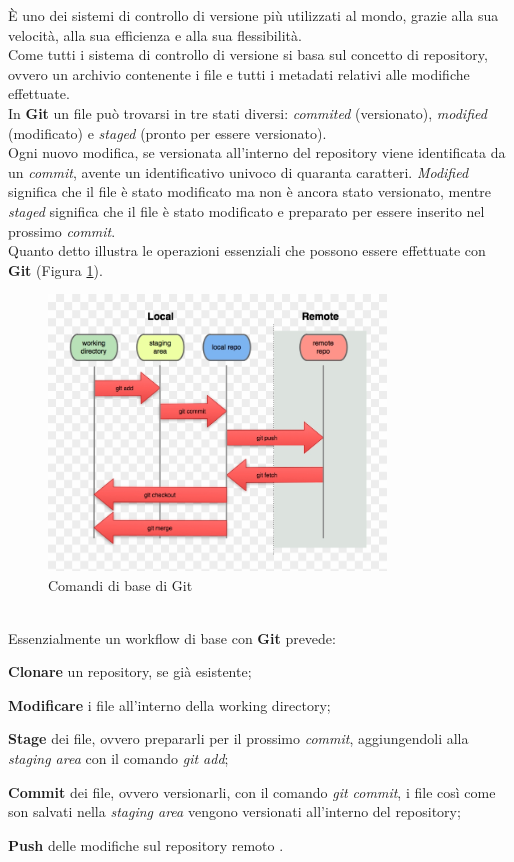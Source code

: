 \noindent È uno dei sistemi di controllo di versione più utilizzati al mondo, grazie alla sua velocità, alla sua efficienza e alla sua flessibilità.\\
Come tutti i sistema di controllo di versione si basa sul concetto di \gls{repository}{}, ovvero un archivio contenente i file e tutti i 
\gls{metadati}{} relativi alle modifiche effettuate.\\  
In \textbf{Git} un file può trovarsi in tre stati diversi: \textit{commited} (versionato), \textit{modified} (modificato) e \textit{staged} (pronto per essere versionato).\\
Ogni nuovo modifica, se versionata all'interno del \gls{repository} viene identificata da un \textit{commit}, avente un identificativo univoco di quaranta caratteri. \textit{Modified} 
significa che il file è stato modificato ma non è ancora stato versionato, mentre \textit{staged} significa che il file è stato modificato e preparato per essere inserito nel 
prossimo \textit{commit}.\\
Quanto detto illustra le operazioni essenziali che possono essere effettuate con \textbf{Git} (Figura \ref{fig:git_workflow}).
\begin{figure}[h]
    \centering
    \includegraphics[width=0.8\textwidth]{images/tecnologie/comandi_git.png}
    \caption{Comandi di base di Git}
    \label{fig:git_workflow}
\end{figure}
\\


Essenzialmente un workflow di base con \textbf{Git} prevede:
\begin{list}{-}{}
    \item \textbf{Clonare} un \gls{repository}{}, se già esistente;
    \item \textbf{Modificare} i file all'interno della \gls{working directory}{};
    \item \textbf{Stage} dei file, ovvero prepararli per il prossimo \textit{commit}, aggiungendoli alla \textit{staging area} con il comando \textit{git add};
    \item \textbf{Commit} dei file, ovvero versionarli, con il comando \textit{git commit}, i file così come son salvati nella \textit{staging area} vengono versionati all'interno del \gls{repository}{};
    \item \textbf{Push} delle modifiche sul \gls{repository}{} remoto \cite{site:Comandi_base_Git}.
\end{list}
\pagebreak
